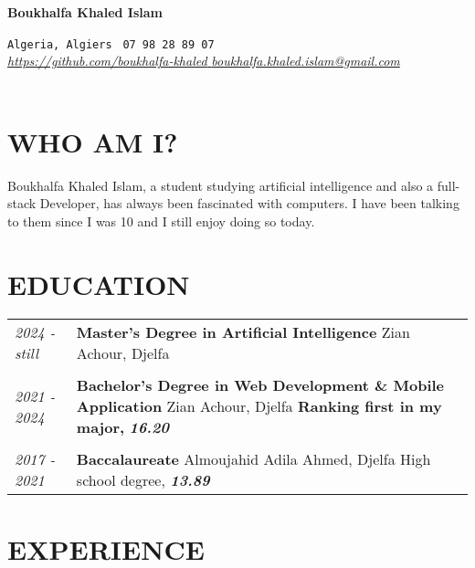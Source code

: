\documentclass[a4paper,12pt]{article}
\begin{document}
\begin{center}
     \Huge{\textbf{Boukhalfa Khaled Islam}}
\end{center}

\texttt{Algeria, Algiers }  \hfill \texttt{07 98 28 89 07 } \\
 \href{https://github.com/boukhalfa-khaled}{\textit{ https://github.com/boukhalfa-khaled }}\hfill \href{mailto:boukhalfa.khaled.islam@gmail.com}{\textit{ boukhalfa.khaled.islam@gmail.com }} \\ 
\\ 

\section{WHO AM I?}
Boukhalfa Khaled Islam, a student studying artificial intelligence and also a full-stack Developer, has always been fascinated with computers. I have been talking to them since I was 10 and I still enjoy doing so today.

\section{EDUCATION}
\begin{tabular}{ l p{15in} }
  
    \textit{2024 - still} & \textbf{Master's Degree in Artificial Intelligence}
    \newline Zian Achour, Djelfa
    \\
    \\

    \textit{2021 - 2024} & \textbf{Bachelor's Degree in Web Development \& Mobile Application}
    \newline Zian Achour, Djelfa
    \newline \textbf{Ranking first in my major,} \textbf{\textit{16.20}}   \\
    \\

    \textit{2017 - 2021 }& \textbf{Baccalaureate}
    \newline Almoujahid Adila Ahmed, Djelfa
    \newline High school degree, \textbf{\textit{13.89}} \\
\end{tabular}

\section{EXPERIENCE}
\end{document}
